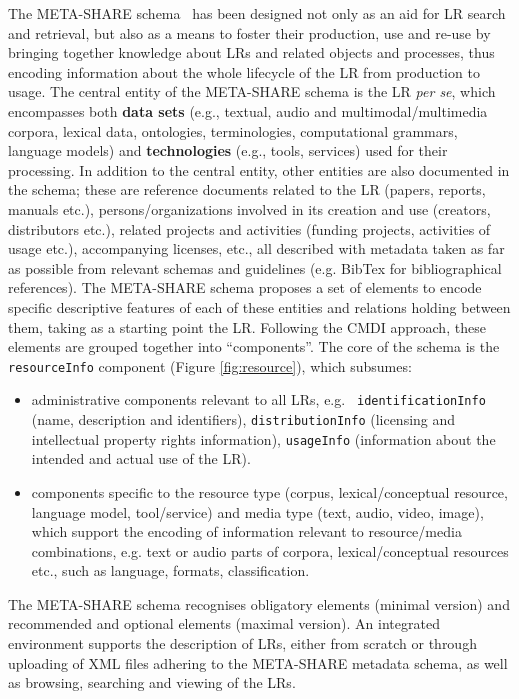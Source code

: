 \documentclass{llncs}
\begin{document}
The META-SHARE schema~\cite{gavrilidou2012metashare} has been designed not only as an aid for LR search and retrieval, but also as a means to foster their production, use and re-use by bringing together knowledge about LRs and related objects and processes, thus encoding information about the whole lifecycle of the LR from production to usage.
The central entity of the META-SHARE schema is the LR \textit{per se}, which
encompasses both {\bf data sets} (e.g., textual, audio and multimodal/multimedia
corpora, lexical data, ontologies, terminologies, computational grammars,
language models) and {\bf technologies} (e.g., tools, services) used for their processing. 
In addition to the central entity, other entities are also documented in the schema; these are reference documents related to the LR (papers, reports,
manuals etc.), persons/organizations involved in its creation and use (creators, distributors etc.), related projects and activities (funding projects,
activities of usage etc.), accompanying licenses, etc., all described with metadata taken as far as possible from relevant schemas and guidelines (e.g. BibTex for bibliographical references). 
The META-SHARE schema proposes a set of elements to encode specific descriptive
features of each of these entities and relations holding between them, taking as
a starting point the LR. Following the CMDI approach, these elements are grouped
together into ``components''. The core of the schema is the {\tt resourceInfo}
component (Figure \ref{fig:resource}), which subsumes: 
\begin{itemize}
\item administrative components relevant to all LRs, e.g. {\tt
    identificationInfo} (name, description and identifiers), {\tt distributionInfo} (licensing and intellectual property rights information), {\tt usageInfo} (information about the intended and actual use of the LR).
\item components specific to the resource type (corpus, lexical/conceptual
    resource, language model, tool/service) and media type (text, audio, video,
    image), which support the encoding of information relevant to resource/media combinations, e.g. text or audio parts of corpora, lexical/conceptual resources etc., such as language, formats, classification.
\end{itemize} 
The META-SHARE schema recognises obligatory elements (minimal version) and recommended and optional elements (maximal version). 
An integrated environment supports the description of LRs, either from scratch or through uploading of XML files adhering to the META-SHARE metadata schema, as well as browsing, searching and viewing of the LRs.
\end{document}
